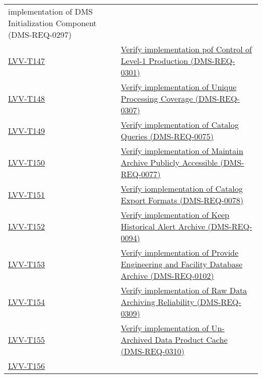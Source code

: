 \begin{longtable}[]{@{}ll@{}}
{implementation of DMS Initialization Component
(DMS-REQ-0297)}\tabularnewline
\protect\hyperlink{lvv-t147---verify-implementation-pof-control-of-level-1-production-dms-req-0301}{LVV-T147}
&
\href{https://jira.lsstcorp.org/secure/Tests.jspa\#/testCase/LVV-T147}{Verify
implementation pof Control of Level-1 Production
(DMS-REQ-0301)}\tabularnewline
\protect\hyperlink{lvv-t148---verify-implementation-of-unique-processing-coverage-dms-req-0307}{LVV-T148}
&
\href{https://jira.lsstcorp.org/secure/Tests.jspa\#/testCase/LVV-T148}{Verify
implementation of Unique Processing Coverage
(DMS-REQ-0307)}\tabularnewline
\protect\hyperlink{lvv-t149---verify-implementation-of-catalog-queries-dms-req-0075}{LVV-T149}
&
\href{https://jira.lsstcorp.org/secure/Tests.jspa\#/testCase/LVV-T149}{Verify
implementation of Catalog Queries (DMS-REQ-0075)}\tabularnewline
\protect\hyperlink{lvv-t150---verify-implementation-of-maintain-archive-publicly-accessible-dms-req-0077}{LVV-T150}
&
\href{https://jira.lsstcorp.org/secure/Tests.jspa\#/testCase/LVV-T150}{Verify
implementation of Maintain Archive Publicly Accessible
(DMS-REQ-0077)}\tabularnewline
\protect\hyperlink{lvv-t151---verify-iomplementation-of-catalog-export-formats-dms-req-0078}{LVV-T151}
&
\href{https://jira.lsstcorp.org/secure/Tests.jspa\#/testCase/LVV-T151}{Verify
iomplementation of Catalog Export Formats (DMS-REQ-0078)}\tabularnewline
\protect\hyperlink{lvv-t152---verify-implementation-of-keep-historical-alert-archive-dms-req-0094}{LVV-T152}
&
\href{https://jira.lsstcorp.org/secure/Tests.jspa\#/testCase/LVV-T152}{Verify
implementation of Keep Historical Alert Archive
(DMS-REQ-0094)}\tabularnewline
\protect\hyperlink{lvv-t153---verify-implementation-of-provide-engineering-and-facility-database-archive-dms-req-0102}{LVV-T153}
&
\href{https://jira.lsstcorp.org/secure/Tests.jspa\#/testCase/LVV-T153}{Verify
implementation of Provide Engineering and Facility Database Archive
(DMS-REQ-0102)}\tabularnewline
\protect\hyperlink{lvv-t154---verify-implementation-of-raw-data-archiving-reliability-dms-req-0309}{LVV-T154}
&
\href{https://jira.lsstcorp.org/secure/Tests.jspa\#/testCase/LVV-T154}{Verify
implementation of Raw Data Archiving Reliability
(DMS-REQ-0309)}\tabularnewline
\protect\hyperlink{lvv-t155---verify-implementation-of-un-archived-data-product-cache-dms-req-0310}{LVV-T155}
&
\href{https://jira.lsstcorp.org/secure/Tests.jspa\#/testCase/LVV-T155}{Verify
implementation of Un-Archived Data Product Cache
(DMS-REQ-0310)}\tabularnewline
\protect\hyperlink{lvv-t156---verify-implementation-of-regenerate-un-archived-data-products-dms-req-0311}{LVV-T156}

\end{longtable}
